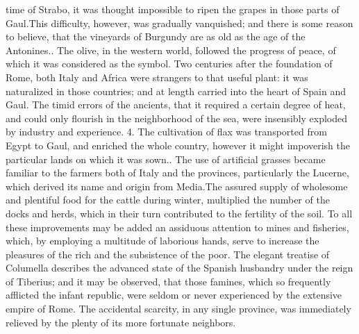 time of Strabo, it was thought impossible to ripen the grapes in
those parts of Gaul.\footnotemark[96] This difficulty, however, was gradually
vanquished; and there is some reason to believe, that the
vineyards of Burgundy are as old as the age of the Antonines.. The olive, in the western world, followed the progress of
peace, of which it was considered as the symbol. Two centuries
after the foundation of Rome, both Italy and Africa were
strangers to that useful plant: it was naturalized in those
countries; and at length carried into the heart of Spain and
Gaul. The timid errors of the ancients, that it required a
certain degree of heat, and could only flourish in the
neighborhood of the sea, were insensibly exploded by industry and
experience. 4. The cultivation of flax was transported from Egypt
to Gaul, and enriched the whole country, however it might
impoverish the particular lands on which it was sown.. The
use of artificial grasses became familiar to the farmers both of
Italy and the provinces, particularly the Lucerne, which derived
its name and origin from Media.\footnotetext[100] The assured supply of
wholesome and plentiful food for the cattle during winter,
multiplied the number of the docks and herds, which in their turn
contributed to the fertility of the soil. To all these
improvements may be added an assiduous attention to mines and
fisheries, which, by employing a multitude of laborious hands,
serve to increase the pleasures of the rich and the subsistence
of the poor. The elegant treatise of Columella describes the
advanced state of the Spanish husbandry under the reign of
Tiberius; and it may be observed, that those famines, which so
frequently afflicted the infant republic, were seldom or never
experienced by the extensive empire of Rome. The accidental
scarcity, in any single province, was immediately relieved by the
plenty of its more fortunate neighbors.




